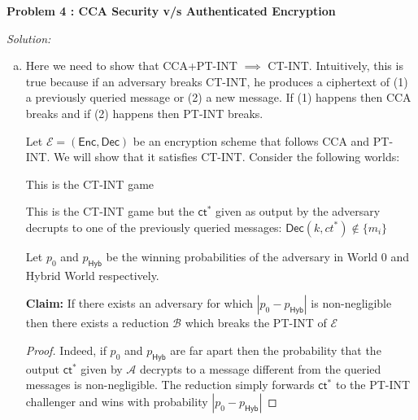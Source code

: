 \documentclass[a4paper, 11pt]{article}
\newenvironment{solution}
    {\textit{Solution:}}
    {\clearpage}
\newcommand{\prob}[1]{\begin{mdframed}[backgroundcolor=gray!20] \textbf{Problem #1}\end{mdframed}}
\newcommand{\ct}{\mathsf{ct}}
\newcommand{\hyb}{\mathsf{Hyb}}
\newcommand{\enc}{\mathsf{Enc}}
\newcommand{\dec}{\mathsf{Dec}}
\newcommand{\calA}{\mathcal{A}}
\newcommand{\calB}{\mathcal{B}}
\newcommand{\calE}{\mathcal{E}}
\begin{document}
\prob{4 : CCA Security v/s Authenticated Encryption}
\begin{solution}
    \begin{enumerate}[(a)]
        \item Here we need to show that CCA+PT-INT $\implies$ CT-INT. Intuitively, this is true because if an adversary breaks CT-INT, he produces a ciphertext of (1) a previously queried message or (2) a new message. If (1) happens then CCA breaks and if (2) happens then PT-INT breaks.

              Let $\calE=(\enc,\dec)$ be an encryption scheme that follows CCA and PT-INT. We will show that it satisfies CT-INT. Consider the following worlds:
              \begin{world}[World 0:]
                  This is the CT-INT game
              \end{world}

              \begin{world}
                  This is the CT-INT game but the $\ct^*$ given as output by the adversary decrupts to one of the previously queried messages: $\dec(k,ct^*)\notin\{m_i\}$
              \end{world}

              Let $p_0$ and $p_\hyb$ be the winning probabilities of the adversary in World 0 and Hybrid World respectively.

              \textbf{Claim:} If there exists an adversary for which $|p_0-p_\hyb|$ is non-negligible then there exists a reduction $\calB$ which breaks the PT-INT of $\calE$
              \begin{proof}
                  Indeed, if $p_0$ and $p_\hyb$ are far apart then the probability that the output $\ct^*$ given by $\calA$ decrypts to a message different from the queried messages is non-negligible. The reduction simply forwards $\ct^*$ to the PT-INT challenger and wins with probability $|p_0-p_\hyb|$
              \end{proof}


\end{enumerate}
\end{solution}
\end{document}
